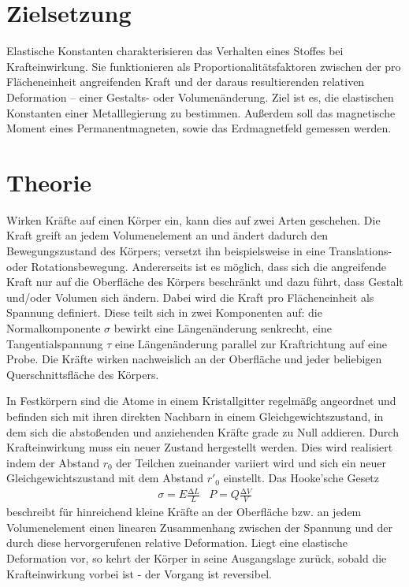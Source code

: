 \section{Zielsetzung}
Elastische Konstanten charakterisieren das Verhalten eines Stoffes bei Krafteinwirkung.
 Sie funktionieren als Proportionalitätsfaktoren zwischen der pro Flächeneinheit angreifenden Kraft und der daraus resultierenden relativen Deformation -- einer Gestalts- oder Volumenänderung. 
Ziel ist es, die elastischen Konstanten einer Metalllegierung zu bestimmen. Außerdem soll das magnetische Moment eines Permanentmagneten, sowie das Erdmagnetfeld gemessen werden.
\section{Theorie}
\label{sec:Theorie}
Wirken Kräfte auf einen Körper ein, kann dies auf zwei Arten geschehen. Die Kraft greift an jedem Volumenelement an und ändert dadurch den Bewegungszustand des Körpers; versetzt ihn beispielsweise in eine Translations- oder Rotationsbewegung. 
Andererseits ist es möglich, dass sich die angreifende Kraft nur auf die Oberfläche des Körpers beschränkt und dazu führt, dass Gestalt und/oder Volumen sich ändern. 
Dabei wird die Kraft pro Flächeneinheit als Spannung definiert. 
Diese teilt sich in zwei Komponenten auf: die Normalkomponente $\sigma$ bewirkt eine Längenänderung senkrecht, eine Tangentialspannung $\tau$ eine Längenänderung parallel zur Kraftrichtung auf eine Probe. 
Die Kräfte wirken nachweislich an der Oberfläche und jeder beliebigen Querschnittsfläche des Körpers. 

In Festkörpern sind die Atome in einem Kristallgitter regelmäßg angeordnet und befinden sich mit ihren direkten Nachbarn in einem Gleichgewichtszustand, in dem sich die abstoßenden und anziehenden Kräfte grade zu Null addieren. 
Durch Krafteinwirkung muss ein neuer Zustand hergestellt werden. 
Dies wird realisiert indem der Abstand $r_0$ der Teilchen zueinander variiert wird und sich ein neuer Gleichgewichtszustand mit dem Abstand $r'_0$ einstellt.
Das Hooke'sche Gesetz
\begin{align}
\sigma=E\frac{\mathup{\Delta}{L}}{L}  & P=Q\frac{\mathup{\Delta}{V}}{V}
\label{eq:hooke}
\end{align}
beschreibt für hinreichend kleine Kräfte an der Oberfläche bzw. an jedem Volumenelement einen linearen Zusammenhang zwischen der Spannung und der durch diese hervorgerufenen relative Deformation.
Liegt eine elastische Deformation vor, so kehrt der Körper in seine Ausgangslage zurück, sobald die Krafteinwirkung vorbei ist - der Vorgang ist reversibel. 




